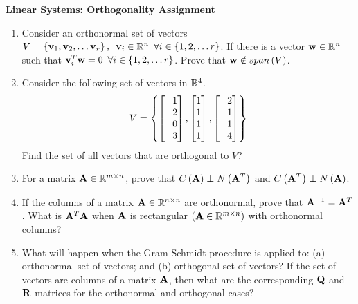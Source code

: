 \documentclass[9pt]{article}
\def\mf{\ensuremath\mathbf}
\def\mb{\ensuremath\mathbb}
\def\lp{\ensuremath\left(}
\def\rp{\ensuremath\right)}
\def\bmx{\ensuremath\begin{bmatrix*}[r]}
\def\emx{\ensuremath\end{bmatrix*}}
\begin{document}
\begin{center}
\begin{Large}
\textbf{Linear Systems: Orthogonality Assignment}
\end{Large}
\end{center}
\vspace{0.2cm}

\begin{multicols}{2}
  \begin{enumerate}
    \item Consider an orthonormal set of vectors $V = \left\{ \mf{v}_1, \mf{v}_2, \ldots \mf{v}_r\right\},\,\,\, \mf{v}_i \in \mb{R}^n\,\,\,\forall i \in \left\{1, 2, \ldots r\right\}$. If there is a vector $\mf{w} \in \mb{R}^n$ such that $\mf{v}_i^T\mf{w} = 0\,\,\,\forall i \in \left\{1, 2, \ldots r\right\}$. Prove that $\mf{w} \notin span\left(V\right)$.
    
    \item Consider the following set of vectors in $\mb{R}^4$.
    \[ V = \left\{
    \bmx
    1\\-2\\0\\3
    \emx,
    \bmx
    1\\1\\1\\1
    \emx,
    \bmx
    2\\-1\\1\\4
    \emx
    \right\} \]
    Find the set of all vectors that are orthogonal to $V$?

    \item For a matrix $\mf{A} \in \mb{R}^{m \times n}$, prove that $C\lp\mf{A}\rp \perp N\lp\mf{A}^T\rp$ and $C\lp\mf{A}^T\rp \perp N\lp\mf{A}\rp$.

    \item If the columns of a matrix $\mf{A} \in \mb{R}^{n \times n}$ are orthonormal, prove that $\mf{A}^{-1} = \mf{A}^T$. What is $\mf{A}^T\mf{A}$ when $\mf{A}$ is rectangular $\left(\mf{A} \in \mb{R}^{m \times n}\right)$ with orthonormal columns?

    \item What will happen when the Gram-Schmidt procedure is applied to: (a) orthonormal set of vectors; and (b) orthogonal set of vectors? If the set of vectors are columns of a matrix $\mf{A}$, then what are the corresponding $\mf{Q}$ and $\mf{R}$ matrices for the orthonormal and orthogonal cases?


\end{enumerate}
\end{multicols}
\end{document}
